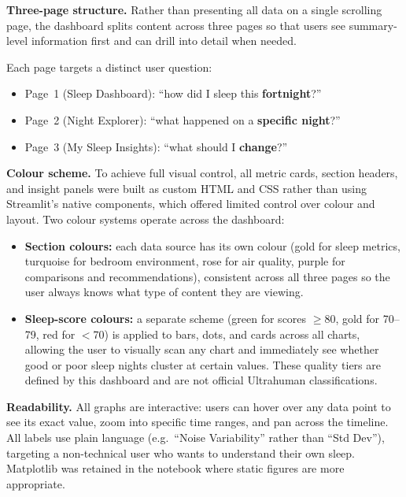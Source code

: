 \documentclass[10pt,a4paper]{extarticle}
\begin{document}
\textbf{Three-page structure.} Rather than presenting all data on a single scrolling page, the dashboard splits content across three pages so that users see summary-level information first and can drill into detail when needed.

\begin{tcolorbox}[
  colback=imperialblue!5,
  colframe=imperialblue,
  leftrule=3pt,
  rightrule=0pt,
  toprule=0pt,
  bottomrule=0pt,
  boxsep=4pt,
  left=8pt,
  right=8pt,
  sharp corners
]
Each page targets a distinct user question:
\begin{itemize}[nosep]
    \item Page~1 (Sleep Dashboard): ``how did I sleep this \textbf{fortnight}?''
    \item Page~2 (Night Explorer): ``what happened on a \textbf{specific night}?''
    \item Page~3 (My Sleep Insights): ``what should I \textbf{change}?''
\end{itemize}
\end{tcolorbox}

\textbf{Colour scheme.} To achieve full visual control, all metric cards, section headers, and insight panels were built as custom HTML and CSS rather than using Streamlit's native components, which offered limited control over colour and layout. Two colour systems operate across the dashboard:

\begin{itemize}[nosep]
    \item \textbf{Section colours:} each data source has its own colour (gold for sleep metrics, turquoise for bedroom environment, rose for air quality, purple for comparisons and recommendations), consistent across all three pages so the user always knows what type of content they are viewing.
    \item \textbf{Sleep-score colours:} a separate scheme (green for scores $\geq$80, gold for 70--79, red for $<$70) is applied to bars, dots, and cards across all charts, allowing the user to visually scan any chart and immediately see whether good or poor sleep nights cluster at certain values. These quality tiers are defined by this dashboard and are not official Ultrahuman classifications.
\end{itemize}

\textbf{Readability.} All graphs are interactive: users can hover over any data point to see its exact value, zoom into specific time ranges, and pan across the timeline. All labels use plain language (e.g.\ ``Noise Variability'' rather than ``Std Dev''), targeting a non-technical user who wants to understand their own sleep. Matplotlib was retained in the notebook where static figures are more appropriate.
\end{document}
